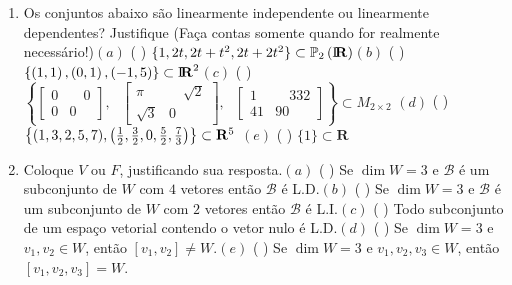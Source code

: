 \documentclass{report}
\begin{document}
\begin{Exercise}
\begin{enumerate}

\item \label{11lista3} Os conjuntos abaixo s\~{a}o
linearmente independente ou linearmente dependentes? Justifique
(Fa\c{c}a contas somente quando for realmente
necess\'{a}rio!)\newline $(a)$ ( \qquad )
$\{1,2t,2t+t^{2},2t+2t^{2}\}\subset \Bbb{P}_{2}\left(
\mbox{${\rm I}\!\mbox{\boldmath $ {\rm R}$}$}%
\right) $\newline $(b)$ ( \qquad ) $\{\left( 1,1\right) ,\left(
0,1\right) ,\left( -1,5\right) \}\subset
\mbox{${\rm I}\!\mbox{\boldmath $ {\rm R}$}$}%
^{2}$\newline $(c)$ ( \qquad ) $\left\{ \left[
\begin{array}{rr}
0 & \quad 0 \\
0 & 0
\end{array}
\right] ,\text{ }\left[
\begin{array}{rr}
\pi & \quad \sqrt{2} \\
\sqrt{3} & 0
\end{array}
\right] ,\text{ }\left[
\begin{array}{rr}
1 & \quad 332 \\
41 & 90
\end{array}
\right] \right\} \subset M_{2\times 2}$\newline
$(d)$ ( \qquad ) $\left\{ (1,3,2,5,7),\left( \frac{1}{2},\frac{3}{2},0,\frac{5%
}{2},\frac{7}{3}\right) \right\} \subset \mathbf{R}^{5}\newline $
$(e)$ ( \qquad ) $\{1\}\subset \mathbf{R}$


\item \label{12lista3} Coloque $V$ ou $F$, justificando sua
resposta.\newline $(a)$ ( \qquad ) Se $\dim W=3$ e $\mathcal{B}$
\'{e} um subconjunto de $W$ com $4$ vetores ent\~{a}o
$\mathcal{B}$ \'{e} L.D.\newline $(b)$ ( \qquad ) Se $\dim W=3$ e
$\mathcal{B}$ \'{e} um subconjunto de $W$ com $2$ vetores
ent\~{a}o $\mathcal{B}$ \'{e} L.I.\newline $(c)$ ( \qquad ) Todo
subconjunto de um espa\c{c}o vetorial contendo o vetor nulo \'{e}
L.D.\newline $(d)$ ( \qquad ) Se $\dim W=3$ e $v_{1},v_{2}\in W$,
ent\~{a}o $\left[ v_{1},v_{2}\right] \neq W$.\newline $(e)$ (
\qquad ) Se $\dim W=3$ e $v_{1},v_{2},v_{3}\in W$, ent\~{a}o
$\left[ v_{1},v_{2},v_{3}\right] =W$.


\end{enumerate}
\end{Exercise}
\end{document}
